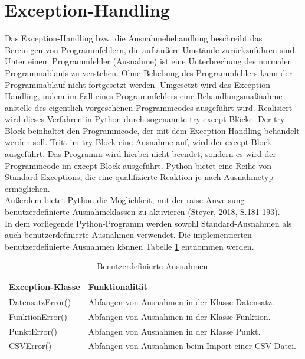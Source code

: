 \documentclass[11pt,a4paper]{scrreprt}
\begin{document}
\section{Exception-Handling}
\label{sec:Exception}
Das Exception-Handling bzw. die Ausnahmebehandlung beschreibt das Bereinigen von Programmfehlern, die auf äußere Umstände zurückzuführen sind. Unter einem Programmfehler (Ausnahme) ist eine Unterbrechung des normalen Programmablaufs zu verstehen. Ohne Behebung des Programmfehlers kann der Programmablauf nicht fortgesetzt werden. Umgesetzt wird das Exception Handling, indem im Fall eines Programmfehlers eine Behandlungsmaßnahme anstelle des eigentlich vorgesehenen Programmcodes ausgeführt wird. Realisiert wird dieses Verfahren in Python durch sogenannte try-except-Blöcke. Der try-Block beinhaltet den Programmcode, der mit dem Exception-Handling behandelt werden soll. Tritt im try-Block eine Ausnahme auf, wird der except-Block ausgeführt. Das Programm wird hierbei nicht beendet, sondern es wird der Programmcode im except-Block ausgeführt.  Python bietet eine Reihe von Standard-Exceptions, die eine qualifizierte Reaktion je nach Ausnahmetyp ermöglichen. \\
Außerdem bietet Python die Möglichkeit, mit der raise-Anweisung benutzerdefinierte Ausnahmeklassen zu aktivieren (Steyer, 2018, S.181-193).\\
In dem vorliegende Python-Programm werden sowohl Standard-Ausnahmen als auch benutzerdefinierte Ausnahmen verwendet. Die implementierten benutzerdefinierte Ausnahmen können Tabelle \ref{tab:ben_Ausnahmen} entnommen werden.
\begin{table}[!h]
\centering
\begin{tabularx}{0.95\textwidth}{|l|X|}
\hline
\textbf{Exception-Klasse} & \textbf{Funktionalität}\\
\hline
DatensatzError() & Abfangen von Ausnahmen in der Klasse Datensatz.\\
\hline
FunktionError() & Abfangen von Ausnahmen in der Klasse Funktion.\\
\hline
PunktError() & Abfangen von Ausnahmen in der Klasse Punkt.\\
\hline
CSVError() & Abfangen von Ausnahmen beim Import einer CSV-Datei.\\
\hline
\end{tabularx}
\caption{Benutzerdefinierte Ausnahmen}
\label{tab:ben_Ausnahmen}
\end{table}
\end{document}
